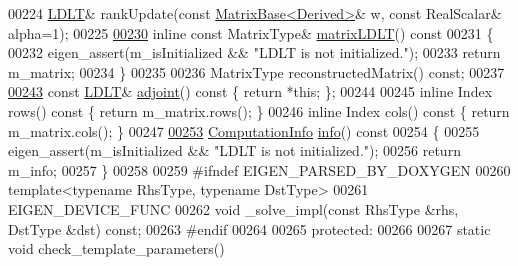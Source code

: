 \begin{DoxyCode}
00224     \hyperlink{group___cholesky___module_class_eigen_1_1_l_d_l_t}{LDLT}& rankUpdate(\textcolor{keyword}{const} \hyperlink{group___core___module_class_eigen_1_1_matrix_base}{MatrixBase<Derived>}& w, \textcolor{keyword}{const} RealScalar& alpha=1);
00225 
\hyperlink{group___cholesky___module_aa5e0fd09dcd5251a8521fa248b95db0b}{00230}     \textcolor{keyword}{inline} \textcolor{keyword}{const} MatrixType& \hyperlink{group___cholesky___module_aa5e0fd09dcd5251a8521fa248b95db0b}{matrixLDLT}()\textcolor{keyword}{ const}
00231 \textcolor{keyword}{    }\{
00232       eigen\_assert(m\_isInitialized && \textcolor{stringliteral}{"LDLT is not initialized."});
00233       \textcolor{keywordflow}{return} m\_matrix;
00234     \}
00235 
00236     MatrixType reconstructedMatrix() \textcolor{keyword}{const};
00237 
\hyperlink{group___cholesky___module_ac656a209860fa0c6a8faa8bb9f9a06ef}{00243}     \textcolor{keyword}{const} \hyperlink{group___cholesky___module_class_eigen_1_1_l_d_l_t}{LDLT}& \hyperlink{group___cholesky___module_ac656a209860fa0c6a8faa8bb9f9a06ef}{adjoint}()\textcolor{keyword}{ const }\{ \textcolor{keywordflow}{return} *\textcolor{keyword}{this}; \};
00244 
00245     \textcolor{keyword}{inline} Index rows()\textcolor{keyword}{ const }\{ \textcolor{keywordflow}{return} m\_matrix.rows(); \}
00246     \textcolor{keyword}{inline} Index cols()\textcolor{keyword}{ const }\{ \textcolor{keywordflow}{return} m\_matrix.cols(); \}
00247 
\hyperlink{group___cholesky___module_a6bd6008501a537d2e16ea672a853bf3e}{00253}     \hyperlink{group__enums_ga85fad7b87587764e5cf6b513a9e0ee5e}{ComputationInfo} \hyperlink{group___cholesky___module_a6bd6008501a537d2e16ea672a853bf3e}{info}()\textcolor{keyword}{ const}
00254 \textcolor{keyword}{    }\{
00255       eigen\_assert(m\_isInitialized && \textcolor{stringliteral}{"LDLT is not initialized."});
00256       \textcolor{keywordflow}{return} m\_info;
00257     \}
00258 
00259 \textcolor{preprocessor}{    #ifndef EIGEN\_PARSED\_BY\_DOXYGEN}
00260     \textcolor{keyword}{template}<\textcolor{keyword}{typename} RhsType, \textcolor{keyword}{typename} DstType>
00261     EIGEN\_DEVICE\_FUNC
00262     \textcolor{keywordtype}{void} \_solve\_impl(\textcolor{keyword}{const} RhsType &rhs, DstType &dst) \textcolor{keyword}{const};
00263 \textcolor{preprocessor}{    #endif}
00264 
00265   \textcolor{keyword}{protected}:
00266 
00267     \textcolor{keyword}{static} \textcolor{keywordtype}{void} check\_template\_parameters()

\end{DoxyCode}
